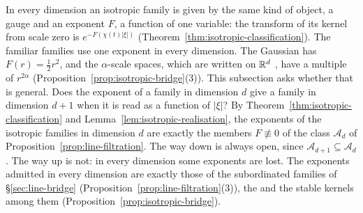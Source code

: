 In every dimension an isotropic family is given by the same kind of object, a gauge and an
exponent $F$, a function of one variable: the transform of its kernel from scale zero is
$e^{-F(\chi(t)|\xi|)}$ (Theorem~\ref{thm:isotropic-classification}). The familiar families use one
exponent in every dimension. The Gaussian has $F(r) = \tfrac12 r^2$, and the $\alpha$-scale
spaces, which are written on $\mathbb{R}^d$ , have a multiple of
$r^{2\alpha}$ (Proposition~\ref{prop:isotropic-bridge}(3)). This subsection asks whether that is
general. Does the exponent of a family in dimension $d$ give a family in dimension $d + 1$ when
it is read as a function of $|\xi|$? By Theorem~\ref{thm:isotropic-classification} and
Lemma~\ref{lem:isotropic-realisation}, the exponents of the isotropic families in dimension $d$
are exactly the members $F \not\equiv 0$ of the class $\mathcal{A}_d$ of
Proposition~\ref{prop:line-filtration}. The way down is always open, since
$\mathcal{A}_{d+1} \subseteq \mathcal{A}_d$. The way up is not: in every dimension some exponents
are lost. The exponents admitted in every dimension are exactly those of the subordinated
families of \S\ref{sec:line-bridge} (Proposition~\ref{prop:line-filtration}(3)), the \Matern{}
and the stable kernels among them (Proposition~\ref{prop:isotropic-bridge}).


